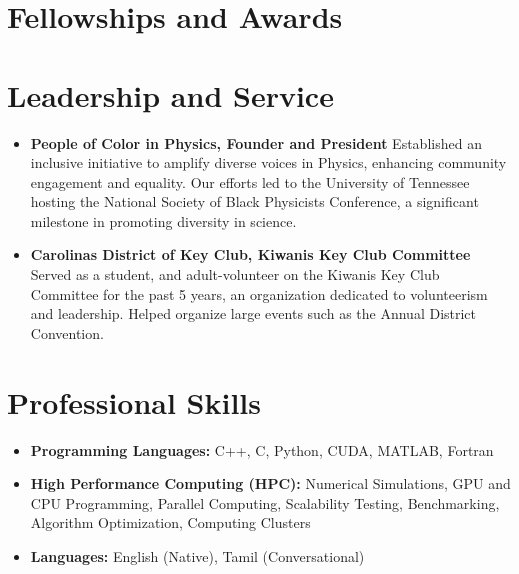 \documentclass[10pt,a4paper,sans]{moderncv}
\begin{document}

\section{Fellowships and Awards}



\section{Leadership and Service}
\begin{itemize}[leftmargin=*]
\item \textbf{People of Color in Physics, Founder and President} Established an inclusive initiative to amplify diverse voices in Physics, enhancing community engagement and equality. Our efforts led to the University of Tennessee hosting the National Society of Black Physicists Conference, a significant milestone in promoting diversity in science.
\item \textbf{Carolinas District of Key Club, Kiwanis Key Club Committee} Served as a student, and adult-volunteer on the Kiwanis Key Club Committee for the past 5 years, an organization dedicated to volunteerism and leadership. Helped organize large events such as the Annual District Convention.
\end{itemize}

\section{Professional Skills}
\begin{itemize}
\item \textbf{Programming Languages:} C++, C, Python, CUDA, MATLAB, Fortran
\item \textbf{High Performance Computing (HPC):} Numerical Simulations, GPU and CPU Programming, Parallel Computing, Scalability Testing, Benchmarking, Algorithm Optimization, Computing Clusters
\item \textbf{Languages:} English (Native), Tamil (Conversational)
\end{itemize}


\end{document}
